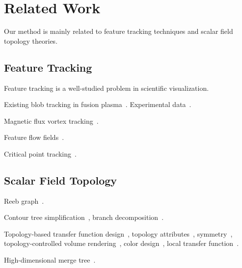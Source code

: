 \section{Related Work}

Our method is mainly related to feature tracking techniques and scalar field topology theories.  

\subsection{Feature Tracking}

Feature tracking is a well-studied problem in scientific visualization.  

Existing blob tracking in fusion plasma~\cite{WuWSCCSCK16}.  Experimental data~\cite{DavisKMRSZ14}.  

Magnetic flux vortex tracking~\cite{GuoPPKG16, GuoPG17, PhillipsGPKG16, PhillipsPKG15}.

Feature flow fields~\cite{TheiselS03}. 

Critical point tracking~\cite{ReininghausKWH12}.


\subsection{Scalar Field Topology}

Reeb graph~\cite{Reeb1946}.  

Contour tree simplification~\cite{CarrSP04, KreveldOBPS97}, branch decomposition~\cite{Pascucci2004}. 

Topology-based transfer function design~\cite{FujishiroAT99}, topology attributes~\cite{TakeshimaTFN04}, symmetry~\cite{ThomasN11}, topology-controlled volume rendering~\cite{WeberDCPH07}, color design~\cite{ZhouT09}, local transfer function~\cite{GuoY13}.  

High-dimensional merge tree~\cite{OesterlingHWMS17}. 
